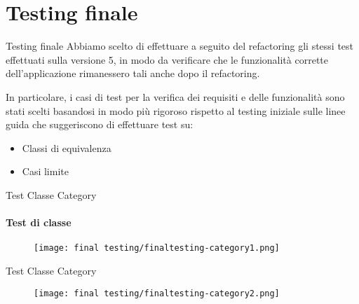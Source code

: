 \section{Testing finale}

\begin{frame}{Testing finale}
    Abbiamo scelto di effettuare a seguito del refactoring gli stessi test effettuati sulla versione 5, in modo da verificare che le funzionalità corrette dell'applicazione rimanessero tali anche dopo il refactoring.\\\bigskip

    In particolare, i casi di test per la verifica dei requisiti e delle funzionalità sono stati scelti basandosi in modo più rigoroso rispetto al testing iniziale sulle linee guida che suggeriscono di effettuare test su:
    \begin{itemize}
        \item Classi di equivalenza
        \item Casi limite
    \end{itemize}
\end{frame}


\begin{frame}{Test Classe Category}
    \framesubtitle{Test di classe}
    
    \begin{figure}
        \centering
        \texttt{[image: final testing/finaltesting-category1.png]}
    \end{figure}    

\end{frame}

\begin{frame}{Test Classe Category}
    \begin{figure}
        \centering
        \texttt{[image: final testing/finaltesting-category2.png]}
    \end{figure}
\end{frame}

